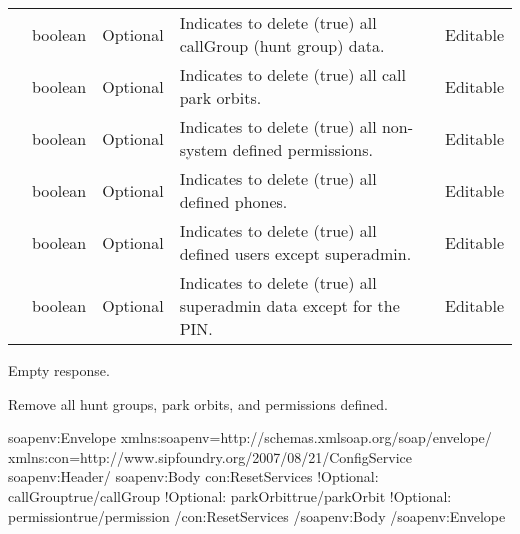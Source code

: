 \documentclass[letterpaper,10pt,english]{sphinxmanual}
\begin{document}


\begin{savenotes}\sphinxattablestart
\centering
\begin{tabulary}{\linewidth}[t]{|T|T|T|T|T|}
\hline

&
&
&
&
\\
\hline
{}
&
boolean
&
Optional
&
Indicates to delete (true) all callGroup (hunt group) data.
&
Editable
\\
\hline
{}
&
boolean
&
Optional
&
Indicates to delete (true) all call park orbits.
&
Editable
\\
\hline
{}
&
boolean
&
Optional
&
Indicates to delete (true) all non-system defined permissions.
&
Editable
\\
\hline
{}
&
boolean
&
Optional
&
Indicates to delete (true) all defined phones.
&
Editable
\\
\hline
{}
&
boolean
&
Optional
&
Indicates to delete (true) all defined users except superadmin.
&
Editable
\\
\hline
{}
&
boolean
&
Optional
&
Indicates to delete (true) all superadmin data except for the PIN.
&
Editable
\\
\hline
\end{tabulary}
\par
\sphinxattableend\end{savenotes}

 Empty response.

 Remove all hunt groups, park orbits, and permissions defined.

\begin{sphinxVerbatim}[commandchars=\\\{\}]
\PYGZlt{}soapenv:Envelope xmlns:soapenv=\PYGZdq{}http://schemas.xmlsoap.org/soap/envelope/\PYGZdq{} xmlns:con=\PYGZdq{}http://www.sipfoundry.org/2007/08/21/ConfigService\PYGZdq{}\PYGZgt{}
\PYGZlt{}soapenv:Header/\PYGZgt{}
\PYGZlt{}soapenv:Body\PYGZgt{}
\PYGZlt{}con:ResetServices\PYGZgt{}
\PYGZlt{}!\PYGZhy{}Optional:\PYGZhy{}\PYGZgt{}
\PYGZlt{}callGroup\PYGZgt{}true\PYGZlt{}/callGroup\PYGZgt{}
\PYGZlt{}!\PYGZhy{}Optional:\PYGZhy{}\PYGZgt{}
\PYGZlt{}parkOrbit\PYGZgt{}true\PYGZlt{}/parkOrbit\PYGZgt{}
\PYGZlt{}!\PYGZhy{}Optional:\PYGZhy{}\PYGZgt{}
\PYGZlt{}permission\PYGZgt{}true\PYGZlt{}/permission\PYGZgt{}
\PYGZlt{}/con:ResetServices\PYGZgt{}
\PYGZlt{}/soapenv:Body\PYGZgt{}
\PYGZlt{}/soapenv:Envelope\PYGZgt{}
\end{sphinxVerbatim}
\end{document}

